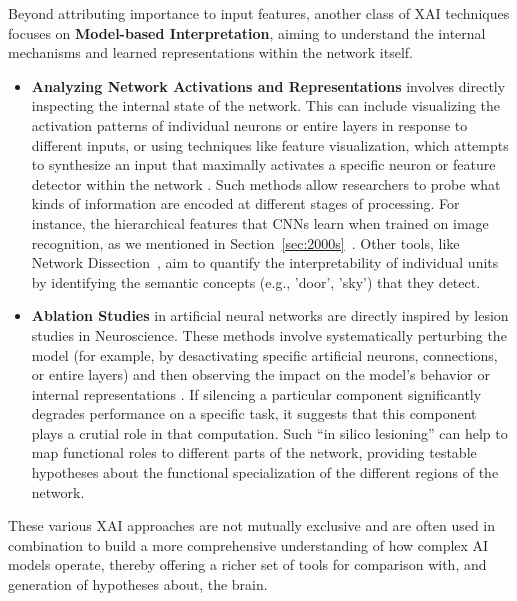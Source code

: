 \documentclass[11pt,a4paper]{article}
\begin{document}
Beyond attributing importance to input features, another class of XAI techniques focuses on \textbf{Model-based Interpretation}, aiming to understand the internal mechanisms and learned representations within the network itself.
\begin{itemize}
    \item \textbf{Analyzing Network Activations and Representations} involves directly inspecting the internal state of the network. This can include visualizing the activation patterns of individual neurons or entire layers in response to different inputs, or using techniques like feature visualization, which attempts to synthesize an input that maximally activates a specific neuron or feature detector within the network \cite{olah2018building}. Such methods allow researchers to probe what kinds of information are encoded at different stages of processing. For instance, the hierarchical features that CNNs learn when trained on image recognition, as we mentioned in Section~\ref{sec:2000s}~\cite{yamins2016using}. Other tools, like Network Dissection~\cite{bau2017network}, aim to quantify the interpretability of individual units by identifying the semantic concepts (e.g., 'door', 'sky') that they detect.

    \item \textbf{Ablation Studies} in artificial neural networks are directly inspired by lesion studies in Neuroscience. These methods involve systematically perturbing the model (for example, by desactivating specific artificial neurons, connections, or entire layers) and then observing the impact on the model's behavior or internal representations \cite{kriegeskorte2018cognitive}. If silencing a particular component significantly degrades performance on a specific task, it suggests that this component plays a crutial role in that computation. Such ``in silico lesioning'' can help to map functional roles to different parts of the network, providing testable hypotheses about the functional specialization of the different regions of the network.
\end{itemize}
These various XAI approaches are not mutually exclusive and are often used in combination to build a more comprehensive understanding of how complex AI models operate, thereby offering a richer set of tools for comparison with, and generation of hypotheses about, the brain.
\end{document}

